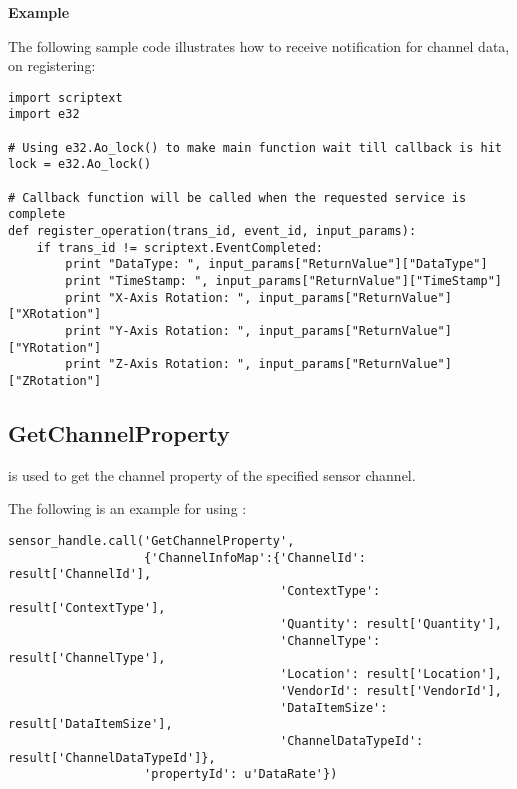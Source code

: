 \newpage
{\bf Example} \break

The following sample code illustrates how to receive notification for channel data, on registering:

\begin{verbatim}
import scriptext
import e32

# Using e32.Ao_lock() to make main function wait till callback is hit
lock = e32.Ao_lock()

# Callback function will be called when the requested service is complete
def register_operation(trans_id, event_id, input_params):
    if trans_id != scriptext.EventCompleted:
        print "DataType: ", input_params["ReturnValue"]["DataType"]
        print "TimeStamp: ", input_params["ReturnValue"]["TimeStamp"]
        print "X-Axis Rotation: ", input_params["ReturnValue"]["XRotation"]
        print "Y-Axis Rotation: ", input_params["ReturnValue"]["YRotation"]
        print "Z-Axis Rotation: ", input_params["ReturnValue"]["ZRotation"]
\end{verbatim}

\pagebreak

\subsection{GetChannelProperty}
\label{subsec:sensorgetchanel}

 is used to get the channel property of the specified sensor channel.

The following is an example for using :

\begin{verbatim}
sensor_handle.call('GetChannelProperty', 
                   {'ChannelInfoMap':{'ChannelId': result['ChannelId'], 
                                      'ContextType': result['ContextType'], 
                                      'Quantity': result['Quantity'], 
                                      'ChannelType': result['ChannelType'], 
                                      'Location': result['Location'], 
                                      'VendorId': result['VendorId'], 
                                      'DataItemSize': result['DataItemSize'], 
                                      'ChannelDataTypeId': result['ChannelDataTypeId']}, 
                   'propertyId': u'DataRate'})
\end{verbatim}

